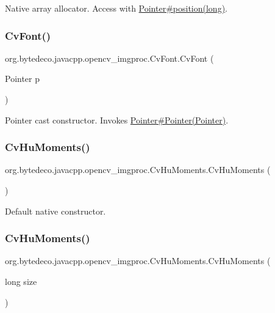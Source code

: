 Native array allocator. Access with \hyperlink{}{Pointer\#position(long)}. \mbox{\label{group__imgproc_ga88da32852b924d5138270b0fbb8e21ce}} 
\subsubsection{\texorpdfstring{Cv\+Font()}{CvFont()}\hspace{0.1cm}{\footnotesize\ttfamily [3/3]}}
{\footnotesize\ttfamily org.\+bytedeco.\+javacpp.\+opencv\+\_\+imgproc.\+Cv\+Font.\+Cv\+Font (\begin{DoxyParamCaption}\item[{Pointer}]{p }\end{DoxyParamCaption})\hspace{0.3cm}{\ttfamily [inline]}}

Pointer cast constructor. Invokes \hyperlink{}{Pointer\#\+Pointer(\+Pointer)}. \mbox{\label{group__imgproc_gaa96e192ed68a69f71a564aebb1dcaa1c}} 
\subsubsection{\texorpdfstring{Cv\+Hu\+Moments()}{CvHuMoments()}\hspace{0.1cm}{\footnotesize\ttfamily [1/3]}}
{\footnotesize\ttfamily org.\+bytedeco.\+javacpp.\+opencv\+\_\+imgproc.\+Cv\+Hu\+Moments.\+Cv\+Hu\+Moments (\begin{DoxyParamCaption}{ }\end{DoxyParamCaption})\hspace{0.3cm}{\ttfamily [inline]}}

Default native constructor. \mbox{\label{group__imgproc_ga49ec073e3eeffc03d3af742e7d041f31}} 
\subsubsection{\texorpdfstring{Cv\+Hu\+Moments()}{CvHuMoments()}\hspace{0.1cm}{\footnotesize\ttfamily [2/3]}}
{\footnotesize\ttfamily org.\+bytedeco.\+javacpp.\+opencv\+\_\+imgproc.\+Cv\+Hu\+Moments.\+Cv\+Hu\+Moments (\begin{DoxyParamCaption}\item[{long}]{size }\end{DoxyParamCaption})\hspace{0.3cm}{\ttfamily [inline]}}

